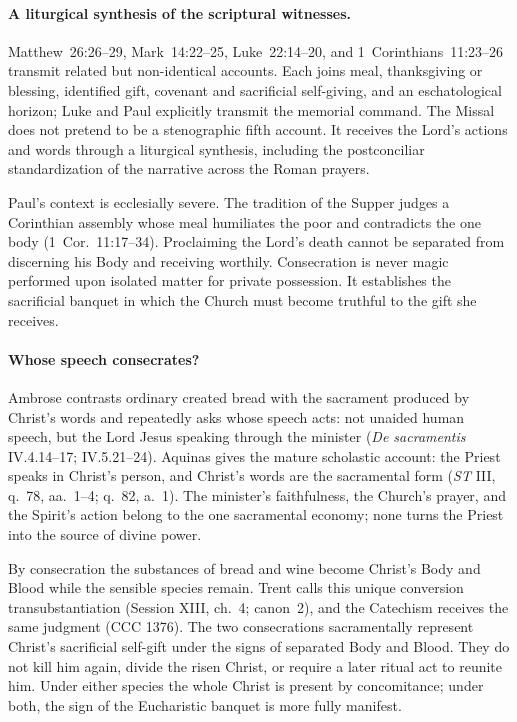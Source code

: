 \paragraph{A liturgical synthesis of the scriptural witnesses.}
Matthew~26:26--29, Mark~14:22--25, Luke~22:14--20, and 1~Corinthians~11:23--26 transmit related but non-identical accounts. Each joins meal, thanksgiving or blessing, identified gift, covenant and sacrificial self-giving, and an eschatological horizon; Luke and Paul explicitly transmit the memorial command. The Missal does not pretend to be a stenographic fifth account. It receives the Lord's actions and words through a liturgical synthesis, including the postconciliar standardization of the narrative across the Roman prayers.

Paul's context is ecclesially severe. The tradition of the Supper judges a Corinthian assembly whose meal humiliates the poor and contradicts the one body (1~Cor.~11:17--34). Proclaiming the Lord's death cannot be separated from discerning his Body and receiving worthily. Consecration is never magic performed upon isolated matter for private possession. It establishes the sacrificial banquet in which the Church must become truthful to the gift she receives.

\paragraph{Whose speech consecrates?}
Ambrose contrasts ordinary created bread with the sacrament produced by Christ's words and repeatedly asks whose speech acts: not unaided human speech, but the Lord Jesus speaking through the minister (\emph{De sacramentis} IV.4.14--17; IV.5.21--24). Aquinas gives the mature scholastic account: the Priest speaks in Christ's person, and Christ's words are the sacramental form (\emph{ST} III, q.~78, aa.~1--4; q.~82, a.~1). The minister's faithfulness, the Church's prayer, and the Spirit's action belong to the one sacramental economy; none turns the Priest into the source of divine power.

By consecration the substances of bread and wine become Christ's Body and Blood while the sensible species remain. Trent calls this unique conversion transubstantiation (Session XIII, ch.~4; canon~2), and the Catechism receives the same judgment (CCC 1376). The two consecrations sacramentally represent Christ's sacrificial self-gift under the signs of separated Body and Blood. They do not kill him again, divide the risen Christ, or require a later ritual act to reunite him. Under either species the whole Christ is present by concomitance; under both, the sign of the Eucharistic banquet is more fully manifest.

